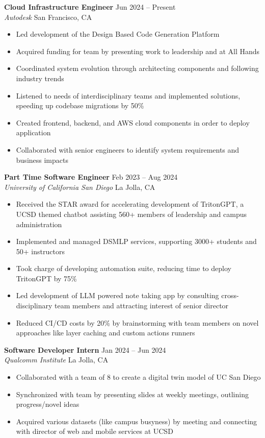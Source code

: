 \documentclass[a4paper,10pt]{article}
\begin{document}
\textbf{Cloud Infrastructure Engineer} \hfill Jun 2024 -- Present \\
\textit{Autodesk} \hfill San Francisco, CA \\
\begin{itemize}[left=0.15in]
    \item Led development of the Design Based Code Generation Platform
    \item Acquired funding for team by presenting work to leadership and at All Hands
    \item Coordinated system evolution through architecting components and following industry trends
    \item Listened to needs of interdisciplinary teams and implemented solutions, speeding up codebase migrations by 50\%
    \item Created frontend, backend, and AWS cloud components in order to deploy application
    \item Collaborated with senior engineers to identify system requirements and business impacts
\end{itemize}

\textbf{Part Time Software Engineer} \hfill Feb 2023 -- Aug 2024 \\
\textit{University of California San Diego} \hfill La Jolla, CA \\
\begin{itemize}[left=0.15in]
    \item Received the STAR award for accelerating development of TritonGPT, a UCSD themed chatbot assisting 560+ members of leadership and campus administration
    \item Implemented and managed DSMLP services, supporting 3000+ students and 50+ instructors
    \item Took charge of developing automation suite, reducing time to deploy TritonGPT by 75\%
    \item Led development of LLM powered note taking app by consulting cross-disciplinary team members and attracting interest of senior director
    \item Reduced CI/CD costs by 20\% by brainstorming with team members on novel approaches like layer caching and custom actions runners
\end{itemize}

\textbf{Software Developer Intern} \hfill Jan 2024 -- Jun 2024 \\
\textit{Qualcomm Institute} \hfill La Jolla, CA \\
\begin{itemize}[left=0.15in]
    \item Collaborated with a team of 8 to create a digital twin model of UC San Diego
    \item Synchronized with team by presenting slides at weekly meetings, outlining progress/novel ideas
    \item Acquired various datasets (like campus busyness) by meeting and connecting with director of web and mobile services at UCSD
\end{itemize}
\end{document}

